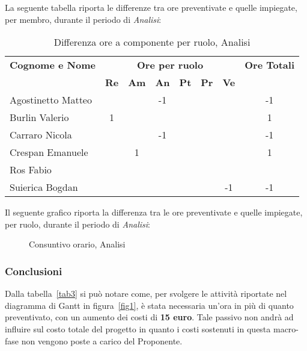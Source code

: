 \noindent La seguente tabella riporta le differenze tra ore preventivate e quelle impiegate, per membro, durante il periodo di \textit{Analisi}: 
\begin{table}[h]
\centering
\begin{tabular}{|l|c|c|c|c|c|c|c|}
	\toprule
	\textbf{Cognome e Nome} & \multicolumn{6}{c}{\textbf{Ore per ruolo}} & \textbf{Ore Totali} \\
	& \textbf{Re} & \textbf{Am} & \textbf{An} & \textbf{Pt} & \textbf{Pr} & \textbf{Ve} & \\
		
	\midrule
	Agostinetto Matteo & & & -1 & & & & -1 \\
	Burlin Valerio & 1 & & & & & & 1 \\ 
	Carraro Nicola & & & -1 & & & & -1 \\
	Crespan Emanuele & & 1 & & & & & 1 \\
	Ros Fabio & & & & & & & \\
	Suierica Bogdan & & & & & & -1 & -1 \\
		
	\bottomrule
\end{tabular}
\caption{Differenza ore a componente per ruolo, Analisi}
\end{table}

\newpage
\noindent Il seguente grafico riporta la differenza tra le ore preventivate e quelle impiegate, per ruolo, durante il periodo di \textit{Analisi}:
\begin{figure}[h]
\centering
{}
\caption{Consuntivo orario, Analisi}
\end{figure}

\subsubsection{Conclusioni}
Dalla tabella~\ref{tab3} si può notare come, per svolgere le attività riportate nel diagramma di \gls{Gantt} in figura~\ref{fig1}, è stata necessaria un'ora in più di quanto preventivato, con un aumento dei costi di \textbf{15 euro}. Tale passivo non andrà ad influire sul costo totale del progetto in quanto i costi sostenuti in questa macro-fase non vengono poste a carico del Proponente.  

